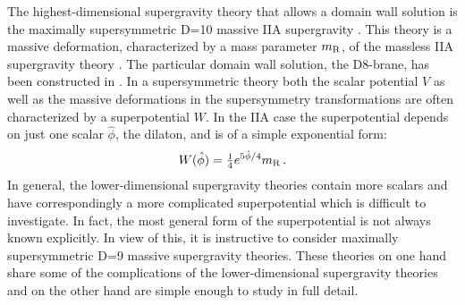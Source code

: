 \documentclass[12pt,a4paper]{article}
\begin{document}
The highest-dimensional supergravity theory that allows a domain
wall solution is the maximally supersymmetric D=10 massive IIA
supergravity \cite{Romans:1986tz}. This theory is a massive
deformation, characterized by a mass parameter $m_{\rm R}$, of the
massless IIA supergravity theory
\cite{Campbell:1984zc,Giani:1984wc}. The particular domain wall
solution, the D8-brane, has been constructed in
\cite{Polchinski:1996df,Bergshoeff:1996ui}. In a supersymmetric
theory both the scalar potential $V$ as well as the massive
deformations in the supersymmetry transformations are often
characterized by a superpotential $W$. In the IIA case the
superpotential depends on just one scalar $\hat \phi$, the
dilaton, and is of a simple exponential form:
%
\begin{equation}
W(\hat\phi) = \tfrac{1}{4} e^{5\hat{\phi}/4} m_{\rm R} \, .
\label{sp10}
\end{equation}
%
In general, the lower-dimensional supergravity theories contain
more scalars and have correspondingly a more complicated
superpotential which is difficult to investigate. In fact, the
most general form of the superpotential is not always known
explicitly. In view of this, it is instructive to consider
maximally supersymmetric D=9 massive supergravity theories. These
theories on one hand share some of the complications of the
lower-dimensional supergravity theories and on the other hand are
simple enough to study in full detail.
\end{document}
